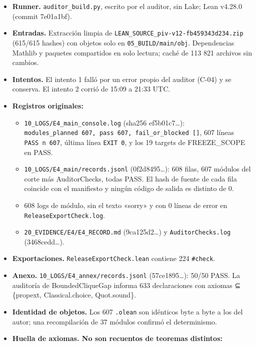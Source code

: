 \documentclass[
]{article}
\providecommand{\tightlist}{%
  \setlength{\itemsep}{0pt}\setlength{\parskip}{0pt}}
\begin{document}
\begin{itemize}
\tightlist
\item
  \textbf{Runner.} \texttt{auditor\_build.py}, escrito por el auditor,
  sin Lake; Lean v4.28.0 (commit 7e01a1bf).
\item
  \textbf{Entradas.} Extracción limpia de
  \texttt{LEAN\_SOURCE\_piv-v12-fb459343d234.zip} (615/615 hashes) con
  objetos solo en \texttt{05\_BUILD/main/obj}. Dependencias Mathlib y
  paquetes compartidos en solo lectura; caché de 113 821 archivos sin
  cambios.
\item
  \textbf{Intentos.} El intento 1 falló por un error propio del auditor
  (C-04) y se conserva. El intento 2 corrió de 15:09 a 21:33 UTC.
\item
  \textbf{Registros originales:}

  \begin{itemize}
  \tightlist
  \item
    \texttt{10\_LOGS/E4\_main\_console.log} (sha256 ef5b01c7\ldots):
    \texttt{modules\_planned\ 607,\ pass\ 607,\ fail\_or\_blocked\ {[}{]}},
    607 líneas \texttt{PASS\ n\ 607}, última línea \texttt{EXIT\ 0}, y
    los 19 targets de FREEZE\_SCOPE en PASS.
  \item
    \texttt{10\_LOGS/E4\_main/records.jsonl} (0f2d8495\ldots): 608
    filas, 607 módulos del corte más AuditorChecks, todas PASS. El hash
    de fuente de cada fila coincide con el manifiesto y ningún código de
    salida es distinto de 0.
  \item
    608 logs de módulo, sin el texto «sorry» y con 0 líneas de error en
    \texttt{ReleaseExportCheck.log}.
  \item
    \texttt{20\_EVIDENCE/E4/E4\_RECORD.md} (9ca125d2\ldots) y
    \texttt{AuditorChecks.log} (3468cedd\ldots).
  \end{itemize}
\item
  \textbf{Exportaciones.} \texttt{ReleaseExportCheck.lean} contiene 224
  \texttt{\#check}.
\item
  \textbf{Anexo.} \texttt{10\_LOGS/E4\_annex/records.jsonl}
  (57ce1895\ldots): 50/50 PASS. La auditoría de BoundedCliqueGap informa
  633 declaraciones con axiomas ⊆ \{propext, Classical.choice,
  Quot.sound\}.
\item
  \textbf{Identidad de objetos.} Los 607 \texttt{.olean} son idénticos
  byte a byte a los del autor; una recompilación de 37 módulos confirmó
  el determinismo.
\item
  \textbf{Huella de axiomas. No son recuentos de teoremas distintos:}


\end{itemize}
\end{document}
